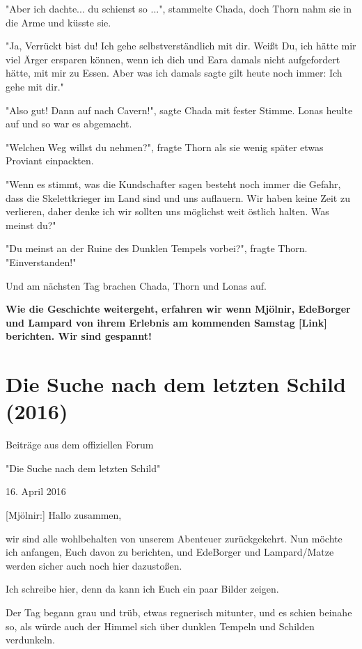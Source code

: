 \documentclass[10pt, a4paper, oneside]{book}
\newcommand{\fillbreak}{\vspace*{\fill}\columnbreak}
\newcommand{\storytext}[1]{%
    \section{#1}%
    \label{Storytext: #1}%
}
\begin{document}
\begin{multicols}{2}
"Aber ich dachte... du schienst so ...", stammelte Chada, doch Thorn nahm sie in die Arme und küsste sie.

"Ja, Verrückt bist du! Ich gehe selbstverständlich mit dir. Weißt Du, ich hätte mir viel Ärger ersparen können, wenn ich dich und Eara damals nicht aufgefordert hätte, mit mir zu Essen. Aber was ich damals sagte gilt heute noch immer: Ich gehe mit dir."

"Also gut! Dann auf nach Cavern!", sagte Chada mit fester Stimme. Lonas heulte auf und so war es abgemacht.

"Welchen Weg willst du nehmen?", fragte Thorn als sie wenig später etwas Proviant einpackten.

"Wenn es stimmt, was die Kundschafter sagen besteht noch immer die Gefahr, dass die Skelettkrieger im Land sind und uns auflauern. Wir haben keine Zeit zu verlieren, daher denke ich wir sollten uns möglichst weit östlich halten. Was meinst du?"

"Du meinst an der Ruine des Dunklen Tempels vorbei?", fragte Thorn. "Einverstanden!"

Und am nächsten Tag brachen Chada, Thorn und Lonas auf.

\textbf{Wie die Geschichte weitergeht, erfahren wir wenn Mjölnir, EdeBorger und Lampard von ihrem Erlebnis am kommenden Samstag [Link] berichten. Wir sind gespannt!}









\fillbreak
\storytext{Die Suche nach dem letzten Schild (2016)}

\begin{center}
    Beiträge aus dem offiziellen Forum

    "Die Suche nach dem letzten Schild"

    16. April 2016
\end{center}



[Mjölnir:] Hallo zusammen,

wir sind alle wohlbehalten von unserem Abenteuer zurückgekehrt. Nun möchte ich anfangen, Euch davon zu berichten, und EdeBorger und Lampard/Matze werden sicher auch noch hier dazustoßen.

Ich schreibe hier, denn da kann ich Euch ein paar Bilder zeigen.

Der Tag begann grau und trüb, etwas regnerisch mitunter, und es schien beinahe so, als würde auch der Himmel sich über dunklen Tempeln und Schilden verdunkeln.


\end{multicols}
\end{document}
